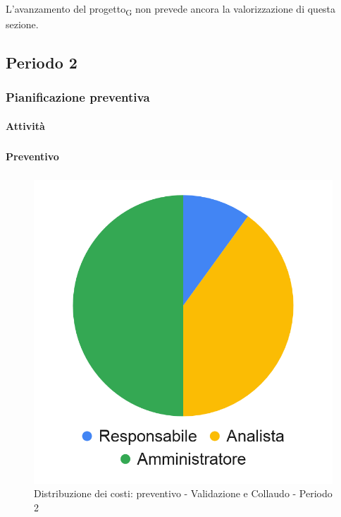 L'avanzamento del progetto\textsubscript{G} non prevede ancora la valorizzazione di questa sezione.




\pagebreak
\subsection{Periodo 2}

\subsubsection{Pianificazione preventiva}

\paragraph{Attività}
\subparagraph*{}

\planningTable{
	
}

\paragraph{Preventivo}
\subparagraph*{}

\hspace{-1cm}
\begin{minipage}{.50\textwidth}
\smallPreventivoTable{
	
}
\end{minipage}
\hspace{1cm}
\begin{minipage}{.40\textwidth}
\begin{figure}[H]
	\includegraphics[scale=0.21]{res/images/charts/preventivo_priori/Grafico4-1.png}
	\caption{Distribuzione dei costi: preventivo - Validazione e Collaudo - Periodo 2}
\end{figure}
\end{minipage} 




